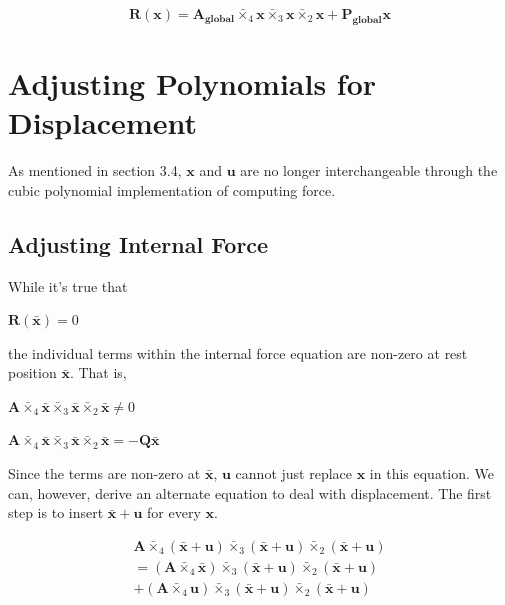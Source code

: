 \documentclass[twocolumn,10pt]{asme2ej}
\begin{document}
\begin{equation}
  \bm{R}(\bm{x}) = \bm{A_{global}} \bar{\times}_4 \bm{x} \bar{\times}_3 \bm{x} \bar{\times}_2 \bm{x} + \bm{P_{global}}\bm{x}
\end{equation}

\section{Adjusting Polynomials for Displacement}

As mentioned in section 3.4, $\bm{x}$ and $\bm{u}$ are no longer interchangeable through the cubic polynomial implementation of computing force.

\subsection{Adjusting Internal Force}

While it's true that

\begin{center}
$\bm{R}(\bm{\bar{x}}) = 0$
\end{center}

\noindent the individual terms within the internal force equation are non-zero at rest position $\bm{\bar{x}}$. That is,

\begin{center}
$\bm{A} \bar{\times}_4 \bm{\bar{x}} \bar{\times}_3 \bm{\bar{x}} \bar{\times}_2 \bm{\bar{x}} \neq 0$

$\bm{A} \bar{\times}_4 \bm{\bar{x}} \bar{\times}_3 \bm{\bar{x}} \bar{\times}_2 \bm{\bar{x}} = -\bm{Q} \bm{\bar{x}}$
\end{center}

Since the terms are non-zero at $\bm{\bar{x}}$, $\bm{u}$ cannot just replace $\bm{x}$ in this equation. We can, however, derive an alternate equation to deal with displacement. The first step is to insert $\bm{\bar{x}} + \bm{u}$ for every $\bm{x}$.

\begin{multline}
\bm{A} \bar{\times}_4 (\bm{\bar{x}} + \bm{u}) \bar{\times}_3 (\bm{\bar{x}} + \bm{u}) \bar{\times}_2 (\bm{\bar{x}}+ \bm{u})
\\ = (\bm{A} \bar{\times}_4 \bm{\bar{x}}) \bar{\times}_3 (\bm{\bar{x}} + \bm{u}) \bar{\times}_2 (\bm{\bar{x}}+ \bm{u})
\\ + (\bm{A} \bar{\times}_4 \bm{u}) \bar{\times}_3 (\bm{\bar{x}} + \bm{u}) \bar{\times}_2 (\bm{\bar{x}}+ \bm{u})
\label{eq_deconstruct}
\end{multline}
\end{document}
